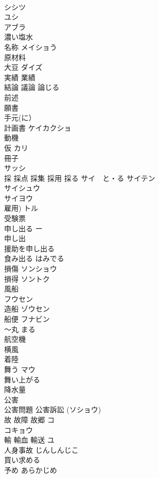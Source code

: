 \documentclass[8pt]{extreport}
\begin{document}
\begin{CJK}{UTF8}{min}
\\	シシツ 
\\	ユシ 
\\	アブラ 
\\	濃い塩水	
\\	名称	メイショう 
\\	原材料	
\\	大豆	ダイズ 
\\	実績 業績	
\\	結論 議論 論じる	
\\	前述	
\\	願書	
\\	手元(に）	
\\	計画書	ケイカクショ 
\\	動機	
\\	仮	カリ 
\\	冊子	
\\	サッシ
\\	採 採点 採集 採用 採る	サイ　と・る サイテン 
\\	サイシュウ 
\\	サイヨウ 
\\	雇用) トル 
\\	受験票	
\\	申し出る ー
\\	申し出	
\\	援助を申し出る　
\\	食み出る	はみでる 
\\	損傷	ソンショウ 
\\	損得	ソントク 
\\	風船	
\\	フウセン
\\	造船	ゾウセン 
\\	船便	フナビン
\\	〜丸	まる 
\\	航空機	
\\	横風	
\\	着陸	
\\	舞う	マウ 
\\	舞い上がる	
\\	降水量	
\\	公害	
\\	公害問題 公害訴訟 (ソショウ) 
\\	故 故障 故郷	コ 
\\	コキョウ
\\	輸 輸血 輸送	ユ 
\\	人身事故	じんしんじこ 
\\	買い求める	
\\	予め	あらかじめ 

\end{CJK}
\end{document}
